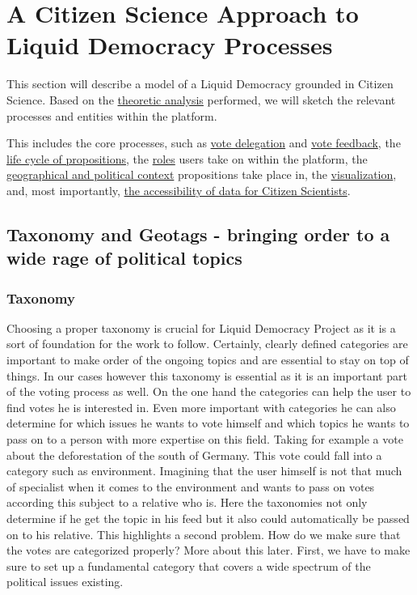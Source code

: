 \chapter{A Citizen Science Approach to Liquid Democracy Processes}
\label{ch:Approach}

This section will describe a model of a Liquid Democracy grounded in Citizen Science. Based on the \href{sec:Theory}{theoretic analysis} performed, we will sketch the relevant processes and entities within the platform. 

This includes the core processes, such as \href{ssec:Model_VoteDelegation}{vote delegation} and \href{ssec:Model_VoteFeedback}{vote feedback}, the \href{ssec:Model_Propositions}{life cycle of propositions}, the \href{ssec:UserRoles}{roles} users take on within the platform, the \href{ssec:Model_Contexts}{geographical and political context} propositions take place in, the \href{ssec:Model_Visualization}{visualization}, and, most importantly, \href{ssec:Model_ResearchersAccess}{the accessibility of data for Citizen Scientists}. 

\section{Taxonomy and Geotags - bringing order to a wide rage of political topics}
\label{sec:Model_Contexts}
\subsection{Taxonomy}
Choosing a proper taxonomy is crucial for Liquid Democracy Project as it is a sort of foundation for the work to follow. Certainly, clearly defined categories are important to make order of the ongoing topics and are essential to stay on top of things. In our cases however this taxonomy is essential as it is an important part of the voting process as well. On the one hand the categories can help the user to find votes he is interested in. Even more important with categories he can also determine for which issues he wants to vote himself and which topics he wants to pass on to a person with more expertise on this field. Taking for example a vote about the deforestation of the south of Germany. This vote could fall into a category such as environment. Imagining that the user himself is not that much of specialist when it comes to the environment and wants to pass on votes according this subject to a relative who is. Here the taxonomies not only determine if he get the topic in his feed but it also could automatically be passed on to his relative. This highlights a second problem. How do we make sure that the votes are categorized properly? More about this later. First, we have to make sure to set up a fundamental category that covers a wide spectrum of the political issues existing.


